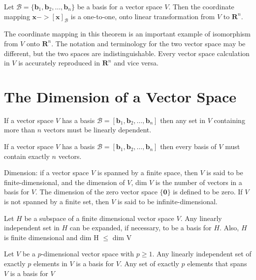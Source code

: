 \documentclass[../linalg.tex]{subfiles}
\begin{document}
\begin{theorem}
    Let $\mathcal{B}=\{\textbf{b}_1,\textbf{b}_2,\dots,\textbf{b}_n\}$ be a basis for a vector space $V$. Then the coordinate mapping $\textbf{x} -> [\textbf{x}]_{\mathcal{B}}$ is a one-to-one, onto linear transformation from $V$ to $\textbf{R}^n$.
\end{theorem}

The coordinate mapping in this theorem is an important example of isomorphism from $V$ onto $\textbf{R}^n$. The notation and terminology for the two vector space may be different, but the two spaces are indistinguishable. Every vector space calculation in $V$ is accurately reproduced in $\textbf{R}^n$ and vice versa.




\section{The Dimension of a Vector Space}
\begin{theorem}
    If a vector space $V$ has a basis $\mathcal{B} = [\textbf{b}_1,\textbf{b}_2,\dots,\textbf{b}_n]$ then any set in $V$ containing more than $n$ vectors must be linearly dependent.
\end{theorem}

\begin{theorem}
    If a vector space $V$ has a basis $\mathcal{B}= [\textbf{b}_1,\textbf{b}_2,\dots,\textbf{b}_n]$ then every basis of $V$ must contain exactly $n$ vectors.
\end{theorem}

Dimension: if a vector space $V$ is spanned by a finite space, then $V$ is said to be finite-dimensional, and the dimension of $V$, dim $V$ is the number of vectors in a basis for $V$. The dimension of the zero vector 
space $\{\textbf{0}\}$ is defined to be zero. If $V$ is not spanned by a finite set, then $V$ is said to be infinite-dimensional. 

\begin{theorem}
    Let $H$ be a subspace of a finite dimensional vector space $V$. Any linearly independent set in $H$ can be expanded, if necessary, to be a basis for $H$. Also, $H$ is finite dimensional and dim H $\leq$ dim V 
\end{theorem}

\begin{theorem}
    Let $V$ be a $p$-dimensional vector space with $p\geq 1$. Any linearly independent set of exactly $p$ elements in $V$ is a basis for $V$. Any set of exactly $p$ elements that spans $V$ is a basis for $V$
\end{theorem}
\end{document}
